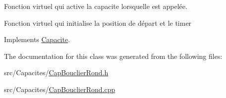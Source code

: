 Fonction virtuel qui active la capacite lorsqu\textquotesingle{}elle est appelée. 

Fonction virtuel qui initialise la position de départ et le timer 

Implements \mbox{\hyperlink{class_capacite_abac1434e2ac3ecc9e5afdafd9a7a4bed}{Capacite}}.



The documentation for this class was generated from the following files\+:\begin{DoxyCompactItemize}
\item 
src/\+Capacites/\mbox{\hyperlink{_cap_bouclier_rond_8h}{Cap\+Bouclier\+Rond.\+h}}\item 
src/\+Capacites/\mbox{\hyperlink{_cap_bouclier_rond_8cpp}{Cap\+Bouclier\+Rond.\+cpp}}\end{DoxyCompactItemize}

